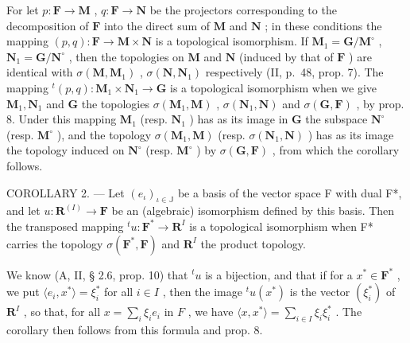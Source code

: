 For let \(p: \mathbf{F} \to \mathbf{M}\) , \(q: \mathbf{F} \to \mathbf{N}\) be the projectors corresponding to the decomposition of \(\mathbf{F}\) into the direct sum of \(\mathbf{M}\) and \(\mathbf{N}\) ; in these conditions the mapping \((p, q): \mathbf{F} \to \mathbf{M} \times \mathbf{N}\) is a topological isomorphism. If \(\mathbf{M}_1 = \mathbf{G} / \mathbf{M}^\circ\) , \(\mathbf{N}_1 = \mathbf{G} / \mathbf{N}^\circ\) , then the topologies on \(\mathbf{M}\) and \(\mathbf{N}\) (induced by that of \(\mathbf{F}\) ) are identical with \(\sigma(\mathbf{M}, \mathbf{M}_1)\) , \(\sigma(\mathbf{N}, \mathbf{N}_1)\) respectively (II, p.~48, prop. 7). The mapping \(^t(p, q): \mathbf{M}_1 \times \mathbf{N}_1 \to \mathbf{G}\) is a topological isomorphism when we give \(\mathbf{M}_1, \mathbf{N}_1\) and \(\mathbf{G}\) the topologies \(\sigma(\mathbf{M}_1, \mathbf{M})\) , \(\sigma(\mathbf{N}_1, \mathbf{N})\) and \(\sigma(\mathbf{G}, \mathbf{F})\) , by prop. 8. Under this mapping \(\mathbf{M}_1\) (resp. \(\mathbf{N}_1\) ) has as its image in \(\mathbf{G}\) the subspace \(\mathbf{N}^\circ\) (resp. \(\mathbf{M}^\circ\) ), and the topology \(\sigma(\mathbf{M}_1, \mathbf{M})\) (resp. \(\sigma(\mathbf{N}_1, \mathbf{N})\) ) has as its image the topology induced on \(\mathbf{N}^\circ\) (resp. \(\mathbf{M}^\circ\) ) by \(\sigma(\mathbf{G}, \mathbf{F})\) , from which the corollary follows.

COROLLARY 2. --- Let \((e_{\iota})_{\iota \in \mathbb{J}}\) be a basis of the vector space F with dual F*, and let \(u: \mathbf{R}^{(I)} \to \mathbf{F}\) be an (algebraic) isomorphism defined by this basis. Then the transposed mapping \({}^t u: \mathbf{F}^* \to \mathbf{R}^I\) is a topological isomorphism when F* carries the topology \(\sigma(\mathbf{F}^*, \mathbf{F})\) and \(\mathbf{R}^I\) the product topology.

We know (A, II, § 2.6, prop. 10) that \({}^t u\) is a bijection, and that if for a \(x^* \in \mathbf{F}^*\) , we put \(\langle e_i, x^* \rangle = \xi_i^*\) for all \(i \in I\) , then the image \({}^t u(x^*)\) is the vector \((\xi_i^*)\) of \(\mathbf{R}^I\) , so that, for all \(x = \sum_{i} \xi_i e_i\) in \(F\) , we have \(\langle x, x^* \rangle = \sum_{i \in I} \xi_i \xi_i^*\) . The corollary then follows from this formula and prop. 8.

